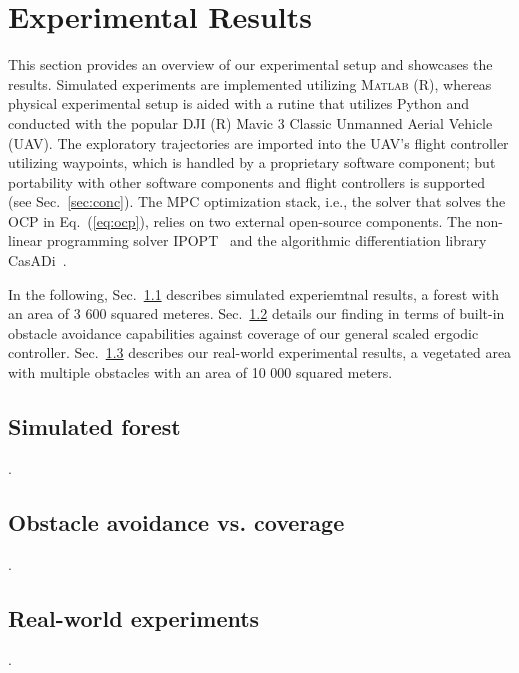 \documentclass[letterpaper,10pt,conference,twoside]{IEEEtran}
\theoremstyle{definition}
\begin{document}
\section{Experimental Results}\label{sec:res}
\noindent
This section provides an overview of our experimental setup and showcases the results. Simulated experiments are implemented utilizing \textsc{Matlab} (R), whereas physical experimental setup is aided with a rutine that utilizes Python and conducted with the popular DJI (R) Mavic 3 Classic Unmanned Aerial Vehicle (UAV). The exploratory trajectories are imported into the UAV's flight controller utilizing waypoints, which is handled by a proprietary software component; but portability with other software components and flight controllers is supported (see Sec.~\ref{sec:conc}). 
The MPC optimization stack, i.e., the solver that solves the OCP in Eq.~(\ref{eq:ocp}), relies on two external open-source components. The non-linear programming solver IPOPT~\cite{wachter2006implementation} and the algorithmic differentiation library CasADi~\cite{andersson2012casadi}.

In the following, Sec.~\ref{sec:res1} describes simulated experiemtnal results, a forest with an area of 3 600 squared meteres. Sec.~\ref{sec:res2} details our finding in terms of built-in obstacle avoidance capabilities against coverage of our general scaled ergodic controller. Sec.~\ref{sec:res3} describes our real-world experimental results, a vegetated area with multiple obstacles  with an area of 10 000 squared meters.

\subsection{Simulated forest}\label{sec:res1}
\noindent
.

\subsection{Obstacle avoidance vs. coverage}\label{sec:res2}
\noindent
.

\subsection{Real-world experiments}\label{sec:res3}
\noindent
.



~
\newpage
\end{document}
